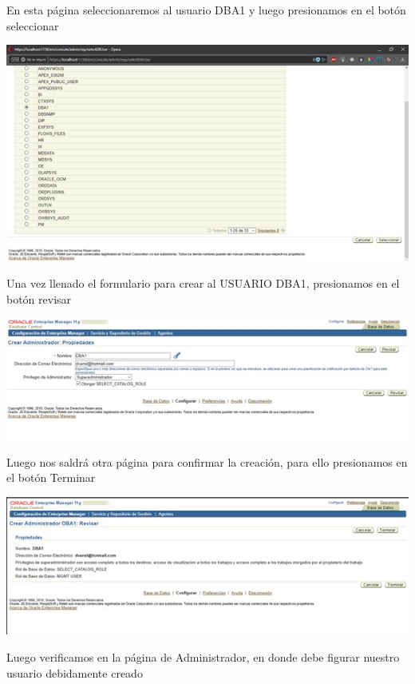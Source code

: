 \begin{flushleft}
\begin{center}
\end{center}
En esta página seleccionaremos al usuario DBA1 y luego presionamos en el botón seleccionar\\
\begin{center}
\includegraphics{images/image-24}\\
\end{center}
Una vez llenado el formulario para crear al USUARIO DBA1, presionamos en el botón revisar\\
\begin{center}
\includegraphics{images/image-25}\\
\end{center}
Luego nos saldrá otra página para confirmar la creación, para ello presionamos en el botón Terminar\\
\begin{center}
\includegraphics{images/image-26}\\
\end{center}
Luego verificamos en la página de Administrador, en donde debe figurar nuestro usuario debidamente creado\\

\end{flushleft}
